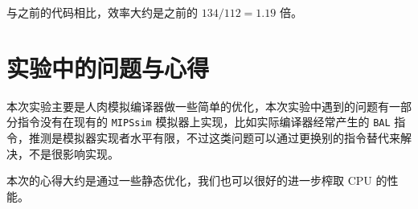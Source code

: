 \documentclass[blue,normal,cn]{elegantnote}
\newcommand{\code}[1]{\colorbox{light-gray}{\texttt{#1}}}
\begin{document}
与之前的代码相比，效率大约是之前的 $134 / 112 = 1.19$ 倍。

\section{实验中的问题与心得}

本次实验主要是人肉模拟编译器做一些简单的优化，本次实验中遇到的问题有一部分指令没有在现有的 \code{MIPSsim} 模拟器上实现，比如实际编译器经常产生的 \code{BAL} 指令，推测是模拟器实现者水平有限，不过这类问题可以通过更换别的指令替代来解决，不是很影响实现。

本次的心得大约是通过一些静态优化，我们也可以很好的进一步榨取 CPU 的性能。
\end{document}
